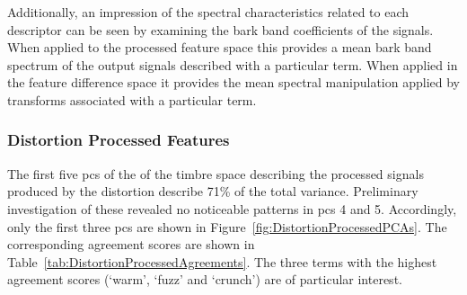 		Additionally, an impression of the spectral characteristics related to each descriptor can be seen by
		examining the bark band coefficients of the signals. When applied to the processed feature space this
		provides a mean bark band spectrum of the output signals described with a particular term. When applied in
		the feature difference space it provides the mean spectral manipulation applied by transforms associated
		with a particular term.

		\subsubsection*{Distortion Processed Features}
			The first five \acrshort{pc}s of the of the timbre space describing the processed signals produced
			by the distortion describe 71\% of the total variance. Preliminary investigation of these revealed
			no noticeable patterns in \acrshort{pc}s 4 and 5. Accordingly, only the first three \acrshort{pc}s
			are shown in Figure~\ref{fig:DistortionProcessedPCAs}. The corresponding agreement scores are shown
			in Table~\ref{tab:DistortionProcessedAgreements}. The three terms with the highest agreement scores
			(`warm', `fuzz' and `crunch') are of particular interest.


